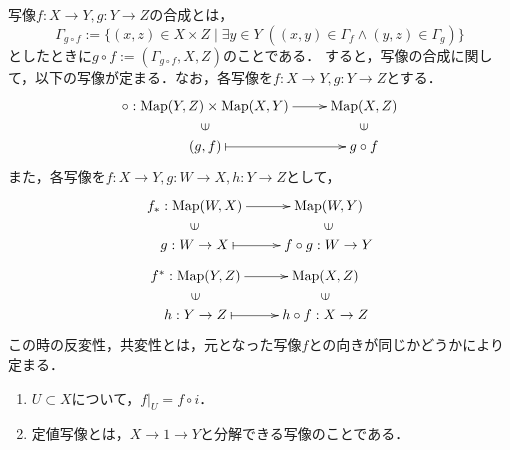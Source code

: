 \documentclass[uplatex,dvipdfmx]{jsreport}
\begin{document}
\begin{definition}[composition]
    写像$f:X\to Y,g:Y\to Z$の合成とは，
    \[\Gamma_{g\circ f}:=\{(x,z)\in X\times Z\mid \exists y\in Y\;((x,y)\in\Gamma_f\land(y,z)\in\Gamma_g)\}\]
    としたときに$g\circ f:=(\Gamma_{g\circ f},X,Z)$のことである．
	すると，写像の合成に関して，以下の写像が定まる．なお，各写像を$f:X\to Y, g:Y\to Z$とする．
    \[\xymatrix@R-2pc{
        \circ :\Map(Y,Z)\times\Map(X,Y)\ar[r]&\Map(X,Z)\\
        \rotatebox[origin=c]{90}{$\in$}&\rotatebox[origin=c]{90}{$\in$}\\
        (g,f)\ar@{|->}[r]&g\circ f
    }\]
	また，各写像を$f:X\to Y, g:W\to X, h:Y\to Z$として，
    \[\xymatrix@R-2pc{
        f_*:\Map(W,X)\ar[r]&\Map(W,Y)\\
        \rotatebox[origin=c]{90}{$\in$}&\rotatebox[origin=c]{90}{$\in$}\\
        g:W\to X\ar@{|->}[r]&f\circ g:W\to Y}\]
    \[\xymatrix@R-2pc{f^*:\Map(Y,Z)\ar[r]&\Map(X,Z)\\
        \rotatebox[origin=c]{90}{$\in$}&\rotatebox[origin=c]{90}{$\in$}\\
        h:Y\to Z\ar@{|->}[r]&h\circ f:X\to Z
    }\]
    この時の反変性，共変性とは，元となった写像$f$との向きが同じかどうかにより定まる．
    \begin{center}
    \end{center}
\end{definition}

\begin{remark}\mbox{}
    \begin{enumerate}
        \item $U\subset X$について，$f|_U=f\circ i$．
        \item 定値写像とは，$X\to 1\to Y$と分解できる写像のことである．
    \end{enumerate}
\end{remark}
\end{document}
